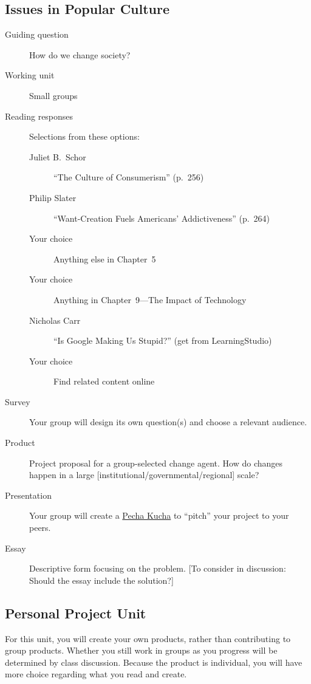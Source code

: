 \documentclass[12pt,oneside]{amsart}	%
\begin{document}
\subsection{Issues in Popular Culture} %
\label{sub:issues_in_popular_culture}
\begin{description}
	\item[Guiding question] How do we change society?
	\item [Working unit] Small groups
	\item [Reading responses] Selections from these options:
	\begin{description}
		\item[Juliet B.\ Schor] ``The Culture of Consumerism'' (p.~256)
		\item[Philip Slater] ``Want-Creation Fuels Americans' Addictiveness'' (p.~264)
		\item[Your choice] Anything else in Chapter~5
		\item[Your choice] Anything in Chapter~9—The Impact of Technology
		\item[Nicholas Carr] ``Is Google Making Us Stupid?'' (get from LearningStudio)
		\item[Your choice] Find related content online
	\end{description}
	\item [Survey] Your group will design its own question(s) and choose a relevant audience.
	\item [Product] Project proposal for a group-selected change agent. How do changes happen in a large [institutional/governmental/regional] scale?
	\item[Presentation] Your group will create a \href{http://www.pechakucha.org/faq}{Pecha Kucha} to ``pitch'' your project to your peers.
	\item [Essay] Descriptive form focusing on the problem. [To consider in discussion: Should the essay include the solution?]
\end{description}

\subsection{Personal Project Unit} %
\label{sub:personal_project_unit}
For this unit, you will create your own products, rather than contributing to group products. Whether you still work in groups as you progress will be determined by class discussion. Because the product is individual, you will have more choice regarding what you read and create.
\end{document}
